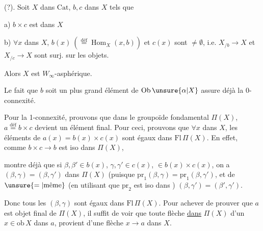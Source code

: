 
\uline{} (?). Soit $X$ dans $\mathrm{Cat}$,  $b,c$ dans $X$ tels que

a) $b\times c$ est dans $X$

b) $\forall x$ dans $X$, $b(x)\ (\overset{\text{déf}}{=}\operatorname{Hom}_{X}(x,b))$ et $c(x)$ sont $\ne\emptyset$, i.e. $X_{/b}\longrightarrow X$ et $X_{/c}\longrightarrow X$ sont surj. sur les objets.

Alors $X$ est $W_\infty$-asphérique.


Le fait que $b$ soit un plus grand élément de $\mathrm{Ob}\,\unsure{\alpha|X}$ assure déjà la 0-connexité.

Pour la 1-connexité, prouvons que dans le groupoïde fondamental $\Pi(X)$, $a\overset{\text{déf}}{=}b\times c$ devient un élément final. Pour ceci, prouvons  que $\forall x$ dans $X$,  les éléments de $a(x)=b(x)\times c(x)$ sont égaux dans $\mathrm{Fl}\,\Pi(X)$. En effet, comme $b\times c\longrightarrow b$ est iso  dans $\Pi(X)$, 


montre déjà que  si $\beta,\beta'\in b(x)$, $\gamma,\gamma'\in c(x)$,   $\in b(x)\times c(x)$, on a $(\beta,\gamma)=(\beta,\gamma')$ dans $\Pi(X)$  (puisque $\mathrm{pr}_1(\beta,\gamma)=\mathrm{pr}_1(\beta,\gamma')$, et de $\unsure{=|\text{même}}$ (en utilisant que $\mathrm{pr}_2$ est iso dans ) $(\beta,\gamma')=(\beta',\gamma')$.

Donc tous les $(\beta,\gamma)$   sont égaux dans $\mathrm{Fl}\,\Pi(X)$. Pour achever de prouver que $a$ est objet final de $\Pi(X)$, il suffit de voir que toute flèche \uline{dans} $\Pi(X)$ d'un $x\in\mathrm{ob}\,X$ dans $a$, provient d'une flèche $x\longrightarrow a$ dans $X$.

